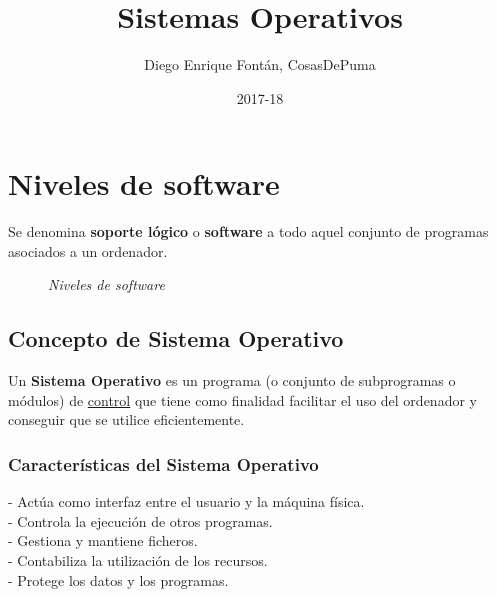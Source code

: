 \documentclass[spanish, 12pt]{article}
\title{Sistemas Operativos}
\author{Diego Enrique Fontán, CosasDePuma}
\date{2017-18}
\begin{document}
	\maketitle
	\newpage
	
	\tableofcontents
	\newpage
	
	
	\section{Niveles de software}
	
	\vfill
	
		Se denomina \textbf{soporte lógico} o \textbf{software} a todo aquel conjunto de programas asociados a un ordenador.\\
		
		\begin{figure}[H]
			\centering
			\caption*{\textit{Niveles de software}}
		\end{figure}
		
		\subsection{Concepto de Sistema Operativo}
		
			Un \textbf{Sistema Operativo} es un programa (o conjunto de subprogramas o módulos) de \underline{control} que tiene como finalidad facilitar el uso del ordenador y conseguir que se utilice eficientemente.\\
			
			\subsubsection{Características del Sistema Operativo}
			
				- Actúa como interfaz entre el usuario y la máquina física.\\
			
				- Controla la ejecución de otros programas.\\
				
				- Gestiona y mantiene ficheros.\\
			
				- Contabiliza la utilización de los recursos.\\
			
				- Protege los datos y los programas.\\
			
\end{document}

